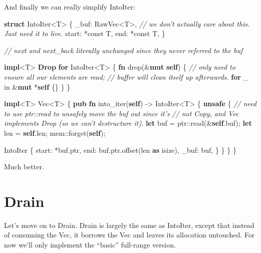 \documentclass[a4paper,]{book}
\newenvironment{Shaded}{\begin{snugshade}}{\end{snugshade}}
\newcommand{\KeywordTok}[1]{\textcolor[rgb]{0.13,0.29,0.53}{\textbf{{#1}}}}
\newcommand{\CommentTok}[1]{\textcolor[rgb]{0.56,0.35,0.01}{\textit{{#1}}}}
\newcommand{\NormalTok}[1]{{#1}}
\begin{document}
And finally we can really simplify IntoIter:

\begin{Shaded}
\begin{Highlighting}[]
\KeywordTok{struct} \NormalTok{IntoIter<T> \{}
    \NormalTok{_buf: RawVec<T>, }\CommentTok{// we don't actually care about this. Just need it to live.}
    \NormalTok{start: *const T,}
    \NormalTok{end: *const T,}
\NormalTok{\}}

\CommentTok{// next and next_back literally unchanged since they never referred to the buf}

\KeywordTok{impl}\NormalTok{<T> }\KeywordTok{Drop} \KeywordTok{for} \NormalTok{IntoIter<T> \{}
    \KeywordTok{fn} \NormalTok{drop(&}\KeywordTok{mut} \KeywordTok{self}\NormalTok{) \{}
        \CommentTok{// only need to ensure all our elements are read;}
        \CommentTok{// buffer will clean itself up afterwards.}
        \KeywordTok{for} \NormalTok{_ in &}\KeywordTok{mut} \NormalTok{*}\KeywordTok{self} \NormalTok{\{\}}
    \NormalTok{\}}
\NormalTok{\}}

\KeywordTok{impl}\NormalTok{<T> Vec<T> \{}
    \KeywordTok{pub} \KeywordTok{fn} \NormalTok{into_iter(}\KeywordTok{self}\NormalTok{) -> IntoIter<T> \{}
        \KeywordTok{unsafe} \NormalTok{\{}
            \CommentTok{// need to use ptr::read to unsafely move the buf out since it's}
            \CommentTok{// not Copy, and Vec implements Drop (so we can't destructure it).}
            \KeywordTok{let} \NormalTok{buf = ptr::read(&}\KeywordTok{self}\NormalTok{.buf);}
            \KeywordTok{let} \NormalTok{len = }\KeywordTok{self}\NormalTok{.len;}
            \NormalTok{mem::forget(}\KeywordTok{self}\NormalTok{);}

            \NormalTok{IntoIter \{}
                \NormalTok{start: *buf.ptr,}
                \NormalTok{end: buf.ptr.offset(len }\KeywordTok{as} \NormalTok{isize),}
                \NormalTok{_buf: buf,}
            \NormalTok{\}}
        \NormalTok{\}}
    \NormalTok{\}}
\NormalTok{\}}
\end{Highlighting}
\end{Shaded}

Much better.

\section{Drain}\label{sec--vec-drain}

Let's move on to Drain. Drain is largely the same as IntoIter, except
that instead of consuming the Vec, it borrows the Vec and leaves its
allocation untouched. For now we'll only implement the ``basic''
full-range version.
\end{document}
